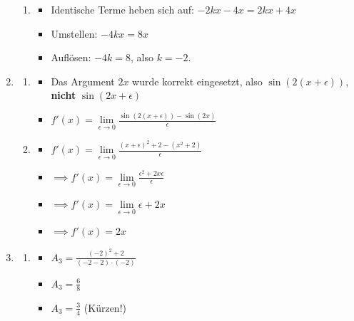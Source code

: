 \documentclass[11pt]{article}
\begin{document}
\begin{enumerate}
\begin{enumerate}
\item 
\begin{itemize}
\item Identische Terme heben sich auf: $-2kx-4x=2kx+4x$
\item Umstellen: $-4kx = 8x$
\item Auflösen: $-4k=8$, also $k=-2$.
\end{itemize}

\end{enumerate}



\item
\begin{enumerate}

\item
\begin{itemize}
\item Das Argument $2x$ wurde korrekt eingesetzt, also $\sin(2(x+\epsilon))$, \textbf{nicht} $\sin(2x+\epsilon)$
\item $f'(x) = \lim\limits_{\epsilon\to 0} \frac{\sin(2(x+\epsilon)) - \sin(2x)}{\epsilon}$
\end{itemize}

\item 
\begin{itemize}
\item $f'(x) = \lim\limits_{\epsilon \to 0} \frac{(x+\epsilon)^2+2-(x^2+2)}{\epsilon}$
\item $\implies f'(x) = \lim\limits_{\epsilon \to 0} \frac{\epsilon^2+2x\epsilon}{\epsilon}$
\item $\implies f'(x) =\lim\limits_{\epsilon \to 0} \epsilon+2x$
\item $\implies f'(x) = 2x$
\end{itemize}

\end{enumerate}

\newpage


\item
\begin{enumerate}

\item
\begin{itemize}
\item $A_3 = \frac{(-2)^2+2}{(-2-2)\cdot(-2)}$
\item $A_3 = \frac{6}{8}$
\item $A_3 = \frac{3}{4}$ (Kürzen!)
\end{itemize}


\end{enumerate}
\end{enumerate}
\end{document}
